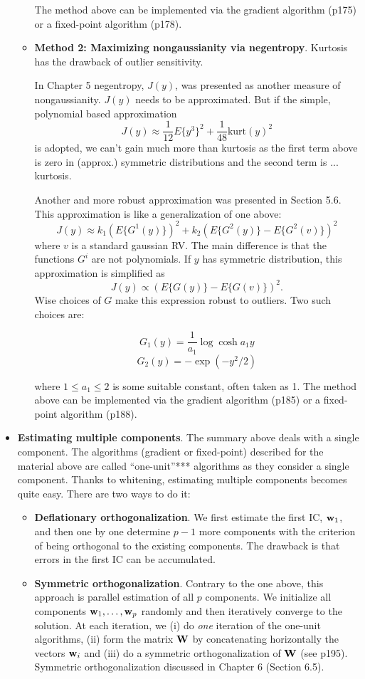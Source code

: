 \documentclass[a4paper]{book}
\begin{document}
\begin{itemize}
\begin{itemize}
The method above can be implemented via the gradient algorithm (p175) or a fixed-point algorithm (p178).

\item \textbf{Method 2: Maximizing nongaussianity via negentropy}. Kurtosis has the drawback of outlier sensitivity.

In Chapter 5 negentropy, $J(y)$,  was presented as another measure of nongaussianity. $J(y)$ needs to be approximated. But if the simple, polynomial based approximation 
$$J(y)\approx \frac{1}{12}E\{y^3\}^2+\frac{1}{48}\text{kurt}(y)^2$$
is adopted, we can't gain much more than kurtosis as the first term above is zero in (approx.) symmetric distributions and the second term is ... kurtosis. 

Another and more robust approximation was presented in Section 5.6. This approximation is like a generalization of one above:
$$J(y)\approx k_1(E\{G^1(y)\})^2 + k_2(E\{G^2(y)\}-E\{G^2(v)\})^2$$
where $v$ is a standard gaussian RV.
The main difference is that the functions $G^i$ are not polynomials. If $y$ has symmetric distribution, this approximation is simplified as 
$$J(y) \propto (E\{G(y)\}-E\{G(v)\})^2.$$
Wise choices of $G$ make this expression robust to outliers. Two such choices are:

$$G_1(y) = \frac{1}{a_1}\log\cosh a_1 y$$
$$G_2(y) = -\exp (-y^2/2)$$

where $1\le a_1 \le 2$ is some suitable constant, often taken as 1.
The method above can be implemented via the gradient algorithm (p185) or a fixed-point algorithm (p188).
\end{itemize}

\item \textbf{Estimating multiple components}. The summary above deals with a single component. The algorithms (gradient or fixed-point) described for the material above are called ``one-unit''*** algorithms as they consider a single component. Thanks to whitening, estimating multiple components becomes quite easy. There are two ways to do it:
	\begin{itemize}
	\item \textbf{Deflationary orthogonalization}. We first estimate the first IC, $\mathbf w_1$, and then one by one determine $p-1$ more components with the criterion of being orthogonal to the existing components. The drawback is that errors in the first IC can be accumulated.
	\item \textbf{Symmetric orthogonalization}. Contrary to the one above, this approach is parallel estimation of all $p$ components. We initialize all components $\mathbf{w}_1,\hdots, \mathbf{w}_p$ randomly and then iteratively converge to the solution. At each iteration, we (i) do \textit{one} iteration of the one-unit algorithms, (ii) form the matrix $\mathbf W$ by concatenating horizontally the vectors $\mathbf w_i$ and (iii) do a symmetric orthogonalization of $\mathbf W$ (see p195). Symmetric orthogonalization discussed in Chapter 6 (Section 6.5). 
	\end{itemize}










\end{itemize}
\end{document}
